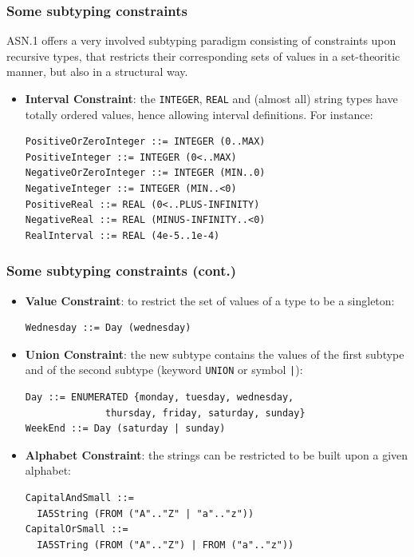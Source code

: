 \documentclass[compress,dvips,xcolor={dvipsnames},t]{beamer}
\newcommand\ASN{\textsf{ASN.1}\xspace}
\begin{document}
\begin{frame}[containsverbatim]
\frametitle{Some subtyping constraints}

\ASN offers a very involved subtyping paradigm consisting of
constraints upon recursive types, that restricts their corresponding
sets of values in a set-theoritic manner, but also in a structural
way.
\begin{itemize}

  \item \textbf{Interval Constraint}: the \texttt{INTEGER},
  \texttt{REAL} and (almost all) string types have totally ordered
  values, hence allowing interval definitions. For instance:

\begin{verbatim}
PositiveOrZeroInteger ::= INTEGER (0..MAX)
PositiveInteger ::= INTEGER (0<..MAX)
NegativeOrZeroInteger ::= INTEGER (MIN..0)
NegativeInteger ::= INTEGER (MIN..<0)
PositiveReal ::= REAL (0<..PLUS-INFINITY)
NegativeReal ::= REAL (MINUS-INFINITY..<0)
RealInterval ::= REAL (4e-5..1e-4)
\end{verbatim}
\end{itemize}

\end{frame}

\begin{frame}[containsverbatim]
\frametitle{Some subtyping constraints (cont.)}

\begin{itemize}

  \item \textbf{Value Constraint}: to restrict the set of values of a
  type to be a singleton:

\begin{verbatim}
Wednesday ::= Day (wednesday)
\end{verbatim}

  \item \textbf{Union Constraint}: the new subtype contains the values
  of the first subtype and of the second subtype (keyword
  \texttt{UNION} or symbol \texttt{|}):

\begin{verbatim}
Day ::= ENUMERATED {monday, tuesday, wednesday,
              thursday, friday, saturday, sunday}
WeekEnd ::= Day (saturday | sunday)
\end{verbatim}

  \item \textbf{Alphabet Constraint}: the strings can be restricted to
  be built upon a given alphabet:

\begin{verbatim}
CapitalAndSmall ::=
  IA5String (FROM ("A".."Z" | "a".."z"))
CapitalOrSmall ::=
  IA5STring (FROM ("A".."Z") | FROM ("a".."z"))
\end{verbatim}

\end{itemize}

\end{frame}
\end{document}
